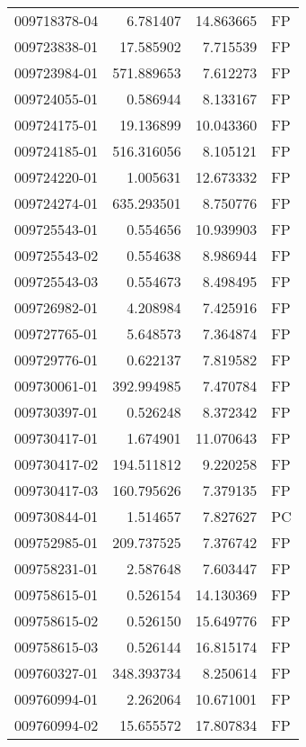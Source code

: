 \begin{tabular}{lrrl}
009718378-04 &    6.781407 &      14.863665 &   FP \\
009723838-01 &   17.585902 &       7.715539 &   FP \\
009723984-01 &  571.889653 &       7.612273 &   FP \\
009724055-01 &    0.586944 &       8.133167 &   FP \\
009724175-01 &   19.136899 &      10.043360 &   FP \\
009724185-01 &  516.316056 &       8.105121 &   FP \\
009724220-01 &    1.005631 &      12.673332 &   FP \\
009724274-01 &  635.293501 &       8.750776 &   FP \\
009725543-01 &    0.554656 &      10.939903 &   FP \\
009725543-02 &    0.554638 &       8.986944 &   FP \\
009725543-03 &    0.554673 &       8.498495 &   FP \\
009726982-01 &    4.208984 &       7.425916 &   FP \\
009727765-01 &    5.648573 &       7.364874 &   FP \\
009729776-01 &    0.622137 &       7.819582 &   FP \\
009730061-01 &  392.994985 &       7.470784 &   FP \\
009730397-01 &    0.526248 &       8.372342 &   FP \\
009730417-01 &    1.674901 &      11.070643 &   FP \\
009730417-02 &  194.511812 &       9.220258 &   FP \\
009730417-03 &  160.795626 &       7.379135 &   FP \\
009730844-01 &    1.514657 &       7.827627 &   PC \\
009752985-01 &  209.737525 &       7.376742 &   FP \\
009758231-01 &    2.587648 &       7.603447 &   FP \\
009758615-01 &    0.526154 &      14.130369 &   FP \\
009758615-02 &    0.526150 &      15.649776 &   FP \\
009758615-03 &    0.526144 &      16.815174 &   FP \\
009760327-01 &  348.393734 &       8.250614 &   FP \\
009760994-01 &    2.262064 &      10.671001 &   FP \\
009760994-02 &   15.655572 &      17.807834 &   FP \\

\end{tabular}
